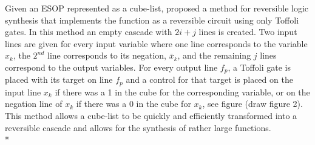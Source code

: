 Given an ESOP represented as a cube-list, \cite{Thornton2007} proposed a 
method for reversible logic synthesis that implements the function as a reversible circuit using only 
Toffoli gates. In this method an empty cascade with $2i + j$ lines is created. Two input lines are given for every input 
variable where one line corresponds to the variable $x_{k}$, the $2^{nd}$ line corresponds to its negation, $\bar{x}_{k}$, 
and the remaining $j$ lines correspond to the output variables. For every output line $f_{p}$, a Toffoli gate 
is placed with its target on line $f_{p}$ and a control for that target is placed on the input line $x_{k}$ if there was a 1
in the cube for the corresponding variable, or on the negation line of $x_{k}$ if there was a 0 in the
cube for $x_{k}$, see figure (draw figure 2). This method allows a cube-list to be quickly and efficiently transformed 
into a reversible cascade and allows for the synthesis of rather large functions. \\*


